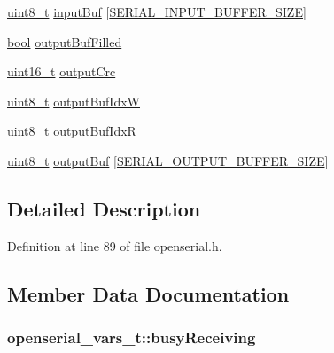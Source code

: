 \begin{DoxyCompactItemize}
\item 
\hyperlink{_p_e___types_8h_aba7bc1797add20fe3efdf37ced1182c5}{uint8\+\_\+t} \hyperlink{structopenserial__vars__t_a41701302af4b1165f480d54d9ebef6d9}{input\+Buf} \mbox{[}\hyperlink{group___open_serial_ga8221a6836587db0f71d30e1da1c1bab3}{S\+E\+R\+I\+A\+L\+\_\+\+I\+N\+P\+U\+T\+\_\+\+B\+U\+F\+F\+E\+R\+\_\+\+S\+I\+ZE}\mbox{]}
\item 
\hyperlink{_p_e___types_8h_a97a80ca1602ebf2303258971a2c938e2}{bool} \hyperlink{structopenserial__vars__t_ac1d8a23992e69cea511d5336e2d04df4}{output\+Buf\+Filled}
\item 
\hyperlink{_p_e___types_8h_a1f1825b69244eb3ad2c7165ddc99c956}{uint16\+\_\+t} \hyperlink{structopenserial__vars__t_accd7c880a97b11c47d8d0c80df9a9a95}{output\+Crc}
\item 
\hyperlink{_p_e___types_8h_aba7bc1797add20fe3efdf37ced1182c5}{uint8\+\_\+t} \hyperlink{structopenserial__vars__t_a1f9a1d728df39d695458bdcb8fd4d0d9}{output\+Buf\+IdxW}
\item 
\hyperlink{_p_e___types_8h_aba7bc1797add20fe3efdf37ced1182c5}{uint8\+\_\+t} \hyperlink{structopenserial__vars__t_a1f210c5c7efe803f967a9f152f700c6f}{output\+Buf\+IdxR}
\item 
\hyperlink{_p_e___types_8h_aba7bc1797add20fe3efdf37ced1182c5}{uint8\+\_\+t} \hyperlink{structopenserial__vars__t_a3f88c7c284a6a3dce9bb67ced44a9da3}{output\+Buf} \mbox{[}\hyperlink{group___open_serial_gabfe80eb43785493f268187a201692d8e}{S\+E\+R\+I\+A\+L\+\_\+\+O\+U\+T\+P\+U\+T\+\_\+\+B\+U\+F\+F\+E\+R\+\_\+\+S\+I\+ZE}\mbox{]}
\end{DoxyCompactItemize}


\subsection{Detailed Description}


Definition at line 89 of file openserial.\+h.



\subsection{Member Data Documentation}
\subsubsection[{\texorpdfstring{busy\+Receiving}{busyReceiving}}]{ openserial\+\_\+vars\+\_\+t\+::busy\+Receiving}\hypertarget{structopenserial__vars__t_a2e727be840a75735e52424e968c24111}{}\label{structopenserial__vars__t_a2e727be840a75735e52424e968c24111}


